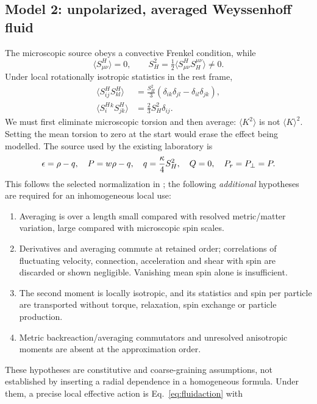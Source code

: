 \subsection{Model 2: unpolarized, averaged Weyssenhoff fluid}
The microscopic source obeys a convective Frenkel condition, while
\begin{equation}
 \langle S^H_{\mu\nu}\rangle=0,\qquad
 S_H^2=\tfrac12\langle S^H_{\mu\nu}S_H^{\mu\nu}\rangle\ne0.
\end{equation}
Under local rotationally isotropic statistics in the rest frame,
\begin{align}
 \langle S^H_{ij}S^H_{kl}\rangle&=\frac{S_H^2}{3}(\delta_{ik}\delta_{jl}-\delta_{il}\delta_{jk}),\\
 \langle S^H_{i}{}^k S^H_{jk}\rangle&=\frac23 S_H^2\delta_{ij}.
\end{align}
We must first eliminate microscopic torsion and then average: $\langle K^2\rangle$ is not $\langle K\rangle^2$. Setting the mean torsion to zero at the start would erase the effect being modelled. The source used by the existing laboratory is
\begin{equation}\label{eq:avgsource}
 \epsilon=\rho-q,\quad P=w\rho-q,\quad q=\frac{\kappa}4 S_H^2,\quad Q=0,\quad P_r=P_\perp=P.
\end{equation}
This follows the selected normalization in \cite{Hashemi}; the following \emph{additional} hypotheses are required for an inhomogeneous local use:
\begin{enumerate}
 \item Averaging is over a length small compared with resolved metric/matter variation, large compared with microscopic spin scales.
 \item Derivatives and averaging commute at retained order; correlations of fluctuating velocity, connection, acceleration and shear with spin are discarded or shown negligible. Vanishing mean spin alone is insufficient.
 \item The second moment is locally isotropic, and its statistics and spin per particle are transported without torque, relaxation, spin exchange or particle production.
 \item Metric backreaction/averaging commutators and unresolved anisotropic moments are absent at the approximation order.
\end{enumerate}
These hypotheses are constitutive and coarse-graining assumptions, not established by inserting a radial dependence in a homogeneous formula. Under them, a precise local effective action is Eq.~\eqref{eq:fluidaction} with
